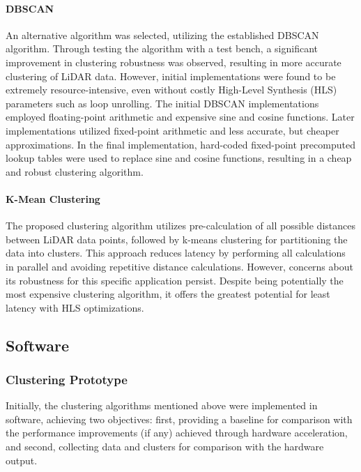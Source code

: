 \documentclass[journal]{IEEEtran} %
\begin{document}
\paragraph{DBSCAN}
An alternative algorithm was selected, utilizing the established DBSCAN algorithm. Through testing the algorithm with a test bench, a significant improvement in clustering robustness was observed, resulting in more accurate clustering of LiDAR data. However, initial implementations were found to be extremely resource-intensive, even without costly High-Level Synthesis (HLS) parameters such as loop unrolling. The initial DBSCAN implementations employed floating-point arithmetic and expensive sine and cosine functions. Later implementations utilized fixed-point arithmetic and less accurate, but cheaper approximations. In the final implementation, hard-coded fixed-point precomputed lookup tables were used to replace sine and cosine functions, resulting in a cheap and robust clustering algorithm.\\

\paragraph{K-Mean Clustering}
The proposed clustering algorithm utilizes pre-calculation of all possible distances between LiDAR data points, followed by k-means clustering for partitioning the data into clusters. This approach reduces latency by performing all calculations in parallel and avoiding repetitive distance calculations. However, concerns about its robustness for this specific application persist. Despite being potentially the most expensive clustering algorithm, it offers the greatest potential for least latency with HLS optimizations.\\

\subsection{Software}
\subsubsection{Clustering Prototype}
Initially, the clustering algorithms mentioned above were implemented in software, achieving two objectives: first, providing a baseline for comparison with the performance improvements (if any) achieved through hardware acceleration, and second, collecting data and clusters for comparison with the hardware output.\\
\end{document}
